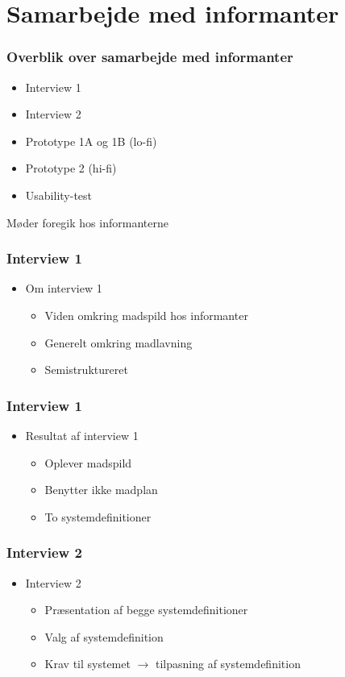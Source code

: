\section{Samarbejde med informanter}

\begin{frame}
\frametitle{Overblik over samarbejde med informanter}
	\begin{itemize}	
		\item Interview 1
		\item Interview 2
		\item Prototype 1A og 1B (lo-fi)
		\item Prototype 2 (hi-fi)
		\item Usability-test
	\end{itemize}
		Møder foregik hos informanterne
\end{frame}

\begin{frame}
\frametitle{Interview 1}
	\begin{itemize}
	\item Om interview 1
			\begin{itemize}
			\item Viden omkring madspild hos informanter
			\item Generelt omkring madlavning
			\item Semistruktureret
			\end{itemize}
	\end{itemize}
\end{frame}

\begin{frame}
\frametitle{Interview 1}
	\begin{itemize}
	\item Resultat af interview 1
			\begin{itemize}
				\item Oplever madspild
				\item Benytter ikke madplan
				\item To systemdefinitioner
			\end{itemize}	
	\end{itemize}
\end{frame}

\begin{frame}
\frametitle{Interview 2}
	\begin{itemize}
	\item Interview 2
			\begin{itemize}
			\item Præsentation af begge systemdefinitioner
			\item Valg af systemdefinition
			\item Krav til systemet $\rightarrow$ tilpasning af systemdefinition
			\end{itemize}
	\end{itemize}
\end{frame}

